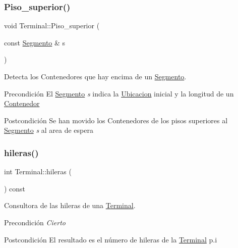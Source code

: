 \subsubsection{\texorpdfstring{Piso\+\_\+superior()}{Piso\_superior()}}
{\footnotesize\ttfamily void Terminal\+::\+Piso\+\_\+superior (\begin{DoxyParamCaption}\item[{const \hyperlink{class_segmento}{Segmento} \&}]{s }\end{DoxyParamCaption})}



Detecta los Contenedores que hay encima de un \hyperlink{class_segmento}{Segmento}. 

\begin{DoxyPrecond}{Precondición}
El \hyperlink{class_segmento}{Segmento} {\itshape s} indica la \hyperlink{class_ubicacion}{Ubicacion} inicial y la longitud de un \hyperlink{class_contenedor}{Contenedor} 
\end{DoxyPrecond}
\begin{DoxyPostcond}{Postcondición}
Se han movido los Contenedores de los pisos superiores al \hyperlink{class_segmento}{Segmento} {\itshape s} al area de espera 
\end{DoxyPostcond}
\mbox{\label{class_terminal_a6e7268ad5b0ffbf1484f1f1522e800f0}} 
\subsubsection{\texorpdfstring{hileras()}{hileras()}}
{\footnotesize\ttfamily int Terminal\+::hileras (\begin{DoxyParamCaption}{ }\end{DoxyParamCaption}) const}



Consultora de las hileras de una \hyperlink{class_terminal}{Terminal}. 

\begin{DoxyPrecond}{Precondición}
{\itshape Cierto} 
\end{DoxyPrecond}
\begin{DoxyPostcond}{Postcondición}
El resultado es el número de hileras de la \hyperlink{class_terminal}{Terminal} p.\+i 
\end{DoxyPostcond}
\mbox{\label{class_terminal_a06602e79ec9e7bca40d73d7a6c436fe3}} 
